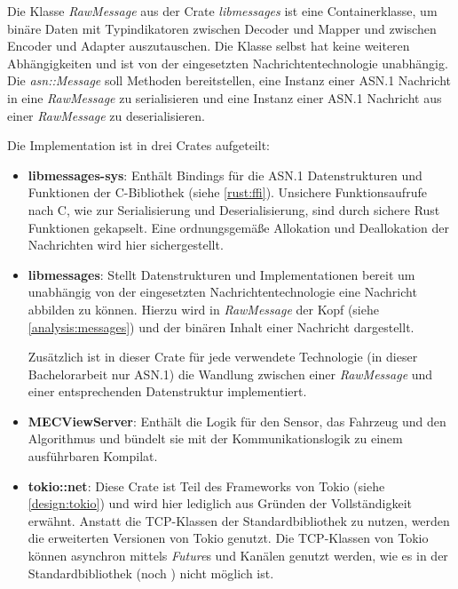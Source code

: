 Die Klasse \textit{RawMessage} aus der Crate \textit{libmessages} ist eine Containerklasse, um binäre Daten mit Typindikatoren zwischen Decoder und Mapper und zwischen Encoder und Adapter auszutauschen.
Die Klasse selbst hat keine weiteren Abhängigkeiten und ist von der eingesetzten Nachrichtentechnologie unabhängig.
Die \textit{asn::Message} soll Methoden bereitstellen, eine Instanz einer ASN.1 Nachricht in eine \textit{RawMessage} zu serialisieren und eine Instanz einer ASN.1 Nachricht aus einer \textit{RawMessage} zu deserialisieren.

Die Implementation ist in drei Crates aufgeteilt:
\begin{itemize}
	\item \textbf{libmessages-sys}: Enthält Bindings für die ASN.1 Datenstrukturen und Funktionen der C-Bibliothek (siehe \autoref{rust:ffi}).
	Unsichere Funktionsaufrufe nach C, wie zur Serialisierung und Deserialisierung, sind durch sichere Rust Funktionen gekapselt.
	Eine ordnungsgemäße Allokation und Deallokation der Nachrichten wird hier sichergestellt.
	
	\item \textbf{libmessages}: Stellt Datenstrukturen und Implementationen bereit um unabhängig von der eingesetzten Nachrichtentechnologie eine Nachricht abbilden zu können.
	Hierzu wird in \textit{RawMessage} der Kopf (siehe \autoref{analysis:messages}) und der binären Inhalt einer Nachricht dargestellt.
	
	Zusätzlich ist in dieser Crate für jede verwendete Technologie (in dieser Bachelorarbeit nur ASN.1) die Wandlung zwischen einer \textit{RawMessage} und einer entsprechenden Datenstruktur implementiert.
	
	\item \textbf{MECViewServer}: Enthält die Logik für den Sensor, das Fahrzeug und den Algorithmus und bündelt sie mit der Kommunikationslogik zu einem ausführbaren Kompilat.
	
	\item \textbf{tokio::net}: Diese Crate ist Teil des Frameworks von Tokio (siehe \autoref{design:tokio}) und wird hier lediglich aus Gründen der Vollständigkeit erwähnt.
	Anstatt die TCP-Klassen der Standardbibliothek zu nutzen, werden die erweiterten Versionen von Tokio genutzt.
	Die TCP-Klassen von Tokio können asynchron mittels \textit{Future}s und Kanälen genutzt werden, wie es in der Standardbibliothek (noch \cite{rust:github:futures}) nicht möglich ist.
\end{itemize}

